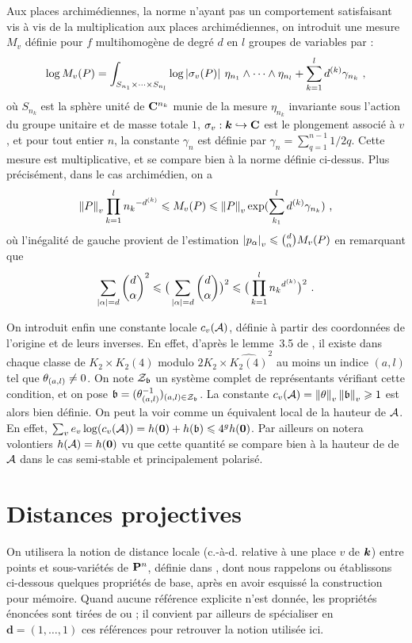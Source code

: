 \documentclass{mpg-preth}
\begin{document}
Aux places archimédiennes, la norme n'ayant pas un comportement satisfaisant
vis à vis de la multiplication aux places archimédiennes, on introduit une
mesure $M_v$ définie pour $f$ multihomogène de degré $d$ en $l$ groupes de
variables par :
\[
  \log \mv P = \int_{S_{n_1} \times \cdots \times S_{n_l}} \log
  \av[]{\sigma_v(P)} \, \eta_{n_1}\wedge\cdots\wedge \eta_{n_l} + \sum_{k=1}^l
  d^{(k)} \gamma_{n_k} \pmm,
\]
où $S_{n_k}$ est la sphère unité de $\C^{n_k}$ munie de la mesure $\eta_{n_k}$
invariante sous l'action du groupe unitaire et de masse totale $1$, $\sigma_v
: \cdn \hookrightarrow \C$ est le plongement associé à $v$, et pour tout
entier $n$, la constante $\gamma_n$ est définie par $\gamma_n =
\sum_{q=1}^{n-1} 1/2q$. Cette mesure est multiplicative, et se compare bien à
la norme définie ci-dessus. Plus précisément, dans le cas archimédien, on a
\[
  \nv P  \prod_{k=1}^l {n_k}^{-d^{(k)}}
  \le \mv P
  \le \nv P \exp(\sum_{k_1}^l d^{(k)} \gamma_{n_k}) \pmm,
\]
où l'inégalité de gauche provient de l'estimation $\av{p_\alpha} \le
\binom{d}{\alpha} \mv P$ \cite[dém. du lemme~3.3]{remgdmp} en remarquant que
\[
 \sum_{\vlg\alpha = d} \binom{d}{\alpha}^2 \le \big(\sum_{\vlg\alpha = d}
 \binom{d}{\alpha}\big)^2 \le \big(\prod_{k=1}^l {n_k}^{d^{(k)}}\big)^2 \pmm.
\]

On introduit enfin une constante locale $c_v(\A)$, définie à partir des
coordonnées de l'origine et de leurs inverses. En effet, d'après le lemme~3.5
de \cite{daphiminvaii}, il existe dans chaque classe de $K_2 \times
\widehat{K_2(4)}$ modulo $2K_2 \times \widehat{K_2(4)}^2$ au moins un indice
$(a, l)$ tel que $\coa_{(a,l)} \neq 0$. On note $\mathcal{Z}_\BA$ un système
complet de représentants vérifiant cette condition, et on pose $\BA =
(\coa_{(a, l)}^{-1})_{(a, l) \in \mathcal{Z}_\BA}$. La constante $c_v(\A) =
\nv{\coa}\nv{\BA} \ge 1$ est alors bien définie. On peut la voir comme un
équivalent local de la hauteur de $\A$. En effet, $\sum_v e_v \log (c_v(\A)) =
h(\OA) + h(\BA) \le 4^g h(\OA)$. Par ailleurs on notera volontiers $h(\A) =
h(\OA)$ vu que cette quantité se compare bien à la hauteur de 
de $\A$ dans le cas semi-stable et principalement polarisé.

\section{Distances projectives}

On utilisera la notion de distance locale (c.-à-d. relative à une place $v$ de
$\cdn$) entre points et sous-variétés de $\Proj^n$, définie dans \cite{pphdg},
dont nous rappelons ou établissons ci-dessous quelques propriétés de base,
après en avoir esquissé la construction pour mémoire. Quand aucune référence
explicite n'est donnée, les propriétés énoncées sont tirées de \cite{pphdg} ou
\cite{remgdmp} ; il convient par ailleurs de spécialiser en $\mathbf{d} = (1,
\dots, 1)$ ces références pour retrouver la notion utilisée ici.
\end{document}
